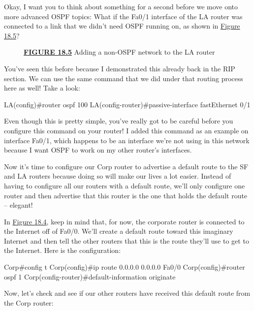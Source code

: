Okay, I want you to think about something for a second before we move
onto more advanced OSPF topics: What if the Fa0/1 interface of the LA
router was connected to a link that we didn't need OSPF running on, as
shown in \protect\hyperlink{c18.xhtmlux5cux23figure18-5}{Figure 18.5}?

\begin{figure}
\centering
\caption{{\protect\hyperlink{c18.xhtmlux5cux23figureanchor18-5}{\textbf{FIGURE
18.5}} Adding a non-OSPF network to the LA router}}
\end{figure}

You've seen this before because I demonstrated this already back in the
RIP section. We can use the same command that we did under that routing
process here as well! Take a look:

\begin{cli}
LA(config)#router ospf 100
LA(config-router)#passive-interface fastEthernet 0/1
\end{cli}

Even though this is pretty simple, you've really got to be careful
before you configure this command on your router! I added this command
as an example on interface Fa0/1, which happens to be an interface we're
not using in this network because I want OSPF to work on my other
router's interfaces.

\protect\hypertarget{c18.xhtmlux5cux23Page_761}{}{}Now it's time to
configure our Corp router to advertise a default route to the SF and LA
routers because doing so will make our lives a lot easier. Instead of
having to configure all our routers with a default route, we'll only
configure one router and then advertise that this router is the one that
holds the default route -- elegant!

In \protect\hyperlink{c18.xhtmlux5cux23figure18-4}{Figure 18.4}, keep in
mind that, for now, the corporate router is connected to the Internet
off of Fa0/0. We'll create a default route toward this imaginary
Internet and then tell the other routers that this is the route they'll
use to get to the Internet. Here is the configuration:

\begin{cli}
Corp#config t
Corp(config)#ip route 0.0.0.0 0.0.0.0 Fa0/0
Corp(config)#router ospf 1
Corp(config-router)#default-information originate
\end{cli}

Now, let's check and see if our other routers have received this default
route from the Corp router:

